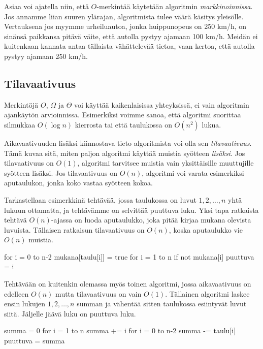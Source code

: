 Asiaa voi ajatella niin, että $O$-merkintää käytetään algoritmin
\emph{markkinoinnissa}. Jos annamme liian suuren ylärajan, algoritmista
tulee väärä käsitys yleisölle.
Vertauksena jos myymme urheiluautoa, jonka huippunopeus on 250 km/h,
on sinänsä paikkansa pitävä väite, että autolla pystyy ajamaan 100 km/h.
Meidän ei kuitenkaan kannata antaa tällaista vähättelevää tietoa,
vaan kertoa, että autolla pystyy ajamaan 250 km/h.

\subsection{Tilavaativuus}


Merkintöjä $O$, $\Omega$ ja $\Theta$ voi käyttää
kaikenlaisissa yhteyksissä, ei vain algoritmin ajankäytön arvioinnissa.
Esimerkiksi voimme sanoa, että algoritmi suorittaa silmukkaa $O(\log n)$ kierrosta
tai että taulukossa on $O(n^2)$ lukua.

Aikavaativuuden lisäksi kiinnostava tieto algoritmista voi olla sen
\emph{tilavaativuus}. Tämä kuvaa sitä, miten paljon algoritmi
käyttää muistia syötteen \emph{lisäksi}.
Jos tilavaativuus on $O(1)$, algoritmi tarvitsee muistia
vain yksittäisille muuttujille syötteen lisäksi.
Jos tilavaativuus on $O(n)$, algoritmi voi varata esimerkiksi aputaulukon,
jonka koko vastaa syötteen kokoa.

Tarkastellaan esimerkkinä tehtävää, jossa taulukossa on
luvut $1,2,\dots,n$ yhtä lukuun ottamatta,
ja tehtävämme on selvittää puuttuva luku.
Yksi tapa ratkaista tehtävä $O(n)$-ajassa on luoda aputaulukko,
joka pitää kirjaa mukana olevista luvuista.
Tällaisen ratkaisun tilavaativuus on $O(n)$,
koska aputaulukko vie $O(n)$ muistia.

\begin{code}
for i = 0 to n-2
    mukana[taulu[i]] = true
for i = 1 to n
    if not mukana[i]
        puuttuva = i
\end{code}

Tehtävään on kuitenkin olemassa myös toinen algoritmi,
jossa aikavaativuus on edelleen $O(n)$ mutta tilavaativuus on vain $O(1)$.
Tällainen algoritmi laskee ensin lukujen $1,2,\dots,n$ summan
ja vähentää sitten taulukossa esiintyvät luvut siitä.
Jäljelle jäävä luku on puuttuva luku.

\begin{code}
summa = 0
for i = 1 to n
    summa += i
for i = 0 to n-2
    summa -= taulu[i]
puuttuva = summa
\end{code}

